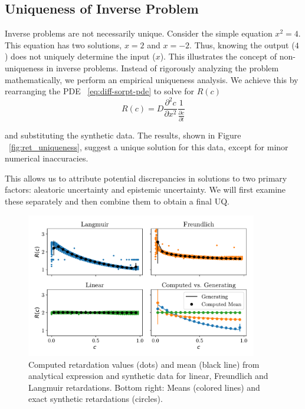 \subsection{Uniqueness of Inverse Problem}
\label{sec:uniqueness}
Inverse problems are not necessarily unique. Consider the simple equation $x^2 = 4$. This equation has two solutions, $x=2$ and $x=-2$. Thus, knowing the output ($4$) does not uniquely determine the input ($x$). This illustrates the concept of non-uniqueness in inverse problems. Instead of rigorously analyzing the problem mathematically, we perform an empirical uniqueness analysis. We achieve this by rearranging the PDE ~\vref{eq:diff-sorpt-pde} to solve for $R(c)$
\begin{equation*}
    R(c) = D \frac{\partial^2 c}{\partial x^2} \frac{1}{\frac{\partial c}{\partial t}}
\end{equation*}

and substituting the synthetic data. The results, shown in Figure ~\vref{fig:ret_uniqueness}, suggest a unique solution for this data, except for minor numerical inaccuracies.

This allows us to attribute potential discrepancies in solutions to two primary factors: aleatoric uncertainty and epistemic uncertainty. We will first examine these separately and then combine them to obtain a final UQ.


\begin{figure}
    \centering
    \includegraphics[width=0.9\textwidth]{figs/ret_uniqueness.pdf}
    \caption{Computed retardation values (dots) and mean (black line) from analytical expression and synthetic data for linear, Freundlich and Langmuir retardations. Bottom right: Means (colored lines) and exact synthetic retardations (circles).}
    \label{fig:ret_uniqueness}
\end{figure}


